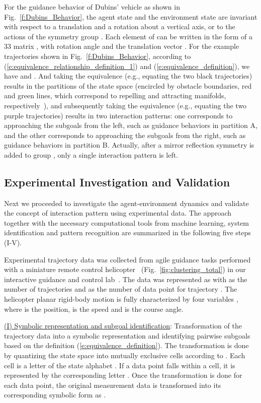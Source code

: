 \documentclass[journal]{IEEEtran}
\begin{document}
For the guidance behavior of Dubins' vehicle as shown in Fig.~\ref{f:Dubins_Behavior}, the agent state and the environment state are invariant with respect to a translation and a rotation about a vertical axis, or to the actions of the symmetry group . Each element of  can be written in the form of a 33 matrix , with rotation angle  and the translation vector . For the example trajectories shown in Fig.~\ref{f:Dubins_Behavior}, according to (\ref{e:equivalence_relationship_definition_1}) and (\ref{e:equivalence_definition}), we have  and . And taking the  equivalence (e.g., equating the two black trajectories) results in the partitions of the state space (encircled by obstacle boundaries, red and green lines, which correspond to repelling and attracting manifolds, respectively~\cite{kong2011investigation}), and subsequently taking the  equivalence (e.g., equating the two purple trajectories) results in two interaction patterns: one corresponds to approaching the subgoals from the left, such as guidance behaviors in partition A, and the other corresponds to approaching the subgoals from the right, such as guidance behaviors in partition B. Actually, after a mirror reflection symmetry is added to group , only a single interaction pattern is left.  


\subsection{Experimental Investigation and Validation}

Next we proceeded to investigate the agent-environment dynamics and validate the concept of interaction pattern using experimental data.  The approach together with the necessary computational tools from machine learning, system identification and pattern recognition are summarized in the following five steps (I-V). 

Experimental trajectory data was collected from agile guidance tasks performed with a miniature remote control helicopter~\cite{kong2011investigation} (Fig.~\ref{fig:clustering_total}) in our interactive guidance and control lab~\cite{mettler2012lab}. The data was represented as  with  as the number of trajectories and  as the number of data point for trajectory . The helicopter planar rigid-body motion is fully characterized by four variables , where  is the position,  is the speed and  is the course angle. 

\underline{(I) Symbolic representation and subgoal identification}: Transformation of the trajectory data into a symbolic representation and identifying pairwise subgoals based on the definition (\ref{e:equivalence_definition}). The transformation is done by quantizing the state space into mutually exclusive cells according to . Each cell is a letter of the state alphabet . If a data point  falls within a cell, it is represented by the corresponding letter . Once the transformation is done for each data point, the original measurement data  is transformed into its corresponding symbolic form as .
\end{document}

